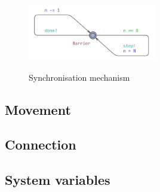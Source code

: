 \begin{figure}[H]
\caption{Synchronisation mechanism}
\centering
\includegraphics[width=0.5\textwidth]{images/implementation_synchronised_barrier.png}
\label{fig:implementation_synchronised_barrier}
\end{figure}

\subsection{Movement}



\subsection{Connection}



\subsection{System variables}
